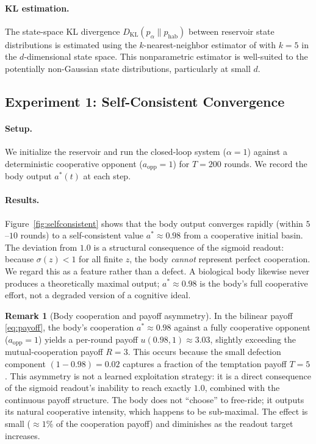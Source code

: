 \documentclass[11pt,a4paper]{article}
\theoremstyle{definition}
\newtheorem{remark}[theorem]{Remark}
\newcommand{\KL}{D_{\mathrm{KL}}}
\newcommand{\abody}{a^{*}}
\begin{document}
\paragraph{KL estimation.}
The state-space KL divergence $\KL(p_\alpha \| p_{\mathrm{hab}})$ between
reservoir state distributions is estimated using the $k$-nearest-neighbor
estimator of \citet{perezcruz2008} with $k = 5$ in the $d$-dimensional
state space.
This nonparametric estimator is well-suited to the potentially non-Gaussian
state distributions, particularly at small $d$.

\subsection{Experiment 1: Self-Consistent Convergence}
\label{sec:exp_selfconsistent}

\paragraph{Setup.}
We initialize the reservoir and run the closed-loop system ($\alpha = 1$)
against a deterministic cooperative opponent ($a_{\mathrm{opp}} = 1$) for
$T = 200$ rounds.  We record the body output $\abody(t)$ at each step.

\paragraph{Results.}
Figure~\ref{fig:selfconsistent} shows that the body output converges
rapidly (within $5$--$10$ rounds) to a self-consistent value
$a^{*} \approx 0.98$ from a cooperative initial basin.  The deviation
from $1.0$ is a structural consequence of the sigmoid readout: because
$\sigma(z) < 1$ for all finite $z$, the body \emph{cannot} represent
perfect cooperation.  We regard this as a feature rather than a defect.
A biological body likewise never produces a theoretically maximal output;
$a^{*} \approx 0.98$ is the body's full cooperative effort, not a
degraded version of a cognitive ideal.

\begin{remark}[Body cooperation and payoff asymmetry]
\label{rem:payoff_asymmetry}
In the bilinear payoff \eqref{eq:payoff}, the body's cooperation
$a^{*} \approx 0.98$ against a fully cooperative opponent ($a_{\mathrm{opp}} = 1$)
yields a per-round payoff $u(0.98, 1) \approx 3.03$, slightly exceeding
the mutual-cooperation payoff $R = 3$.  This occurs because the small
defection component $(1 - 0.98) = 0.02$ captures a fraction of the
temptation payoff $T = 5$.  This asymmetry is not a learned
exploitation strategy: it is a direct consequence of the sigmoid
readout's inability to reach exactly $1.0$, combined with the continuous
payoff structure.  The body does not ``choose'' to free-ride; it outputs
its natural cooperative intensity, which happens to be sub-maximal.
The effect is small ($\approx 1\%$ of the cooperation payoff) and
diminishes as the readout target increases.
\end{remark}
\end{document}

